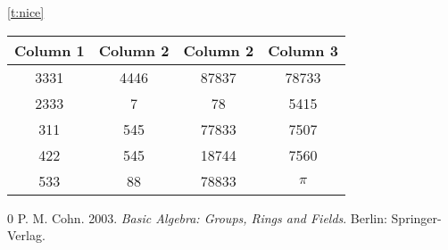 \documentclass[10pt]{article} %
\begin{document}
\begin{center}
\end{center}

\ref{t:nice}

\begin{table*}[h]
\begin{center}
\begin{tabular}{||cccc||}
\hline
Column 1 & Column 2 & Column 2 & Column 3 \\
\hline
\hline
 3331 & 4446 & 87837 & 78733 \\
 2333 & 7 & 78  & 5415\\
 311 & 545 & 77833 & 7507 \\
 422 & 545 & 18744 & 7560\\
 533 & 88 & 78833 & $\pi$ \\	
 \hline
\end{tabular}

\end{center}
\caption[Nice table]{My favorite numbers.}
\label{t:nice}
\end{table*}


\begin{thebibliography}{0}
 P. M. Cohn. 2003. \emph{Basic Algebra: Groups,
Rings and Fields}. Berlin: Springer-Verlag.
\end{thebibliography}
\end{document}
